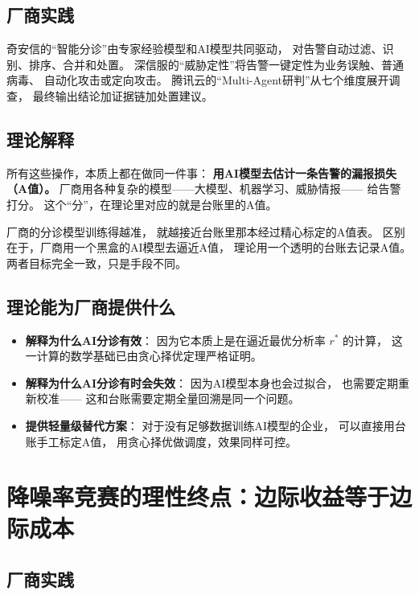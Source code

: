 \documentclass[11pt,a4paper]{article}
\begin{document}
\subsection{厂商实践}

奇安信的“智能分诊”由专家经验模型和AI模型共同驱动，
对告警自动过滤、识别、排序、合并和处置。
深信服的“威胁定性”将告警一键定性为业务误触、普通病毒、
自动化攻击或定向攻击。
腾讯云的“Multi-Agent研判”从七个维度展开调查，
最终输出结论加证据链加处置建议。

\subsection{理论解释}

所有这些操作，本质上都在做同一件事：
\textbf{用AI模型去估计一条告警的漏报损失（A值）。}
厂商用各种复杂的模型——大模型、机器学习、威胁情报——
给告警打分。
这个“分”，在理论里对应的就是台账里的A值。

厂商的分诊模型训练得越准，
就越接近台账里那本经过精心标定的A值表。
区别在于，厂商用一个黑盒的AI模型去逼近A值，
理论用一个透明的台账去记录A值。
两者目标完全一致，只是手段不同。

\subsection{理论能为厂商提供什么}

\begin{itemize}
    \item \textbf{解释为什么AI分诊有效}：
          因为它本质上是在逼近最优分析率 \(r^*\) 的计算，
          这一计算的数学基础已由贪心择优定理严格证明。
    \item \textbf{解释为什么AI分诊有时会失效}：
          因为AI模型本身也会过拟合，
          也需要定期重新校准——
          这和台账需要定期全量回溯是同一个问题。
    \item \textbf{提供轻量级替代方案}：
          对于没有足够数据训练AI模型的企业，
          可以直接用台账手工标定A值，
          用贪心择优做调度，效果同样可控。
\end{itemize}

\section{降噪率竞赛的理性终点：边际收益等于边际成本}

\subsection{厂商实践}
\end{document}

